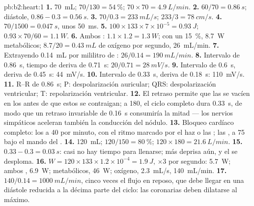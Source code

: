 \begin{solution}{pb:b2:heart:1}
\textbf{1.} \qty{70}{mL}; $70/130 = \qty{54}{\%}$; $70\times 70 =
\qty{4.9}{L/min}$.
\textbf{2.} $60/70 = \qty{0.86}{s}$; diástole, $0.86 - 0.3 =
\qty{0.56}{s}$.
\textbf{3.} $70/0.3 = \qty{233}{mL/s}$; $233/3 = \qty{78}{cm/s}$.
\textbf{4.} $70/1500 = \qty{0.047}{s}$, unos \qty{50}{ms}.
\textbf{5.} $100\times 133\times 7\times 10^{-5} = \qty{0.93}{J}$;
$0.93\times 70/60 = \qty{1.1}{W}$.
\textbf{6.} Ambos : $1.1\times 1.2 = \qty{1.3}{W}$; con un
\qty{15}{\%}, \qty{8.7}{W} metabólicos; $8.7/20 = \qty{0.43}{mL}$ de
oxígeno por segundo, \qty{26}{mL/min}.
\textbf{7.} Extrayendo \qty{0.14}{mL} por mililitro de :
$26/0.14 = \qty{190}{mL/min}$.
\textbf{8.} Intervalo de \qty{0.86}{s}, tiempo de deriva de \qty{0.71}{s}:
$20/0.71 = \qty{28}{mV/s}$.
\textbf{9.} Intervalo de \qty{0.6}{s}, deriva de \qty{0.45}{s}:
\qty{44}{mV/s}.
\textbf{10.} Intervalo de \qty{0.33}{s}, deriva de \qty{0.18}{s}:
\qty{110}{mV/s}.
\textbf{11.} R--R de \qty{0.86}{s}; P: despolarización auricular; QRS:
despolarización ventricular; T: repolarización ventricular.
\textbf{12.} El retraso permite que las  se vacíen en los
 antes de que estos se contraigan; a 180, el ciclo completo
dura \qty{0.33}{s}, de modo que un retraso invariable de \qty{0.16}{s}
consumiría la mitad --- los nervios simpáticos aceleran también la
conducción del nódulo.
\textbf{13.} Bloqueo cardíaco completo: los  a 40 por minuto,
con el ritmo marcado por el haz o las ; las , a
75 bajo el mando del .
\textbf{14.} \qty{120}{mL}; $120/150 = \qty{80}{\%}$; $120\times 180 =
\qty{21.6}{L/min}$.
\textbf{15.} $0.33 - 0.3 = \qty{0.03}{s}$: casi no hay tiempo para llenarse;
más deprisa aún, y el  se desploma.
\textbf{16.} $W = 120\times 133\times 1.2\times 10^{-4} = \qty{1.9}{J}$,
$\times 3$ por segundo: \qty{5.7}{W}; ambos , \qty{6.9}{W};
metabólicos, \qty{46}{W}; oxígeno, \qty{2.3}{mL/s}, \qty{140}{mL/min}.
\textbf{17.} $140/0.14 = \qty{1000}{mL/min}$, cinco veces el flujo en
reposo, que debe llegar en una diástole reducida a la décima parte del
ciclo: las  coronarias deben dilatarse al máximo.

\end{solution}
